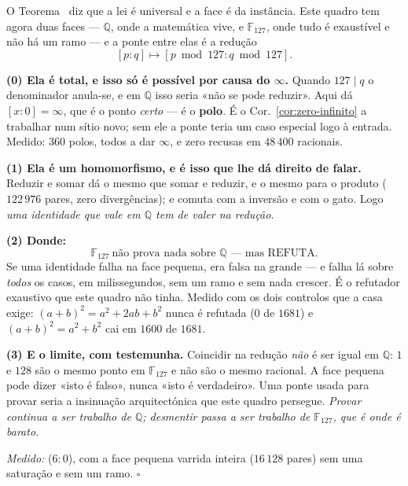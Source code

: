 \documentclass[livro.tex]{subfiles}
\begin{document}
\begin{teorema}\label{thm:reducao}
O Teorema~ diz que a lei é universal e a face é da
instância. Este quadro tem agora duas faces --- $\mathbb{Q}$, onde a
matemática vive, e $\mathbb{F}_{127}$, onde tudo é exaustível e não há um
ramo --- e a ponte entre elas é a redução
\[
[p:q]\longmapsto[p\bmod 127:q\bmod 127].
\]

\textbf{(0) Ela é total, e isso só é possível por causa do $\infty$.}
Quando $127\mid q$ o denominador anula-se, e em $\mathbb{Q}$ isso seria
«não se pode reduzir». Aqui dá $[x:0]=\infty$, que é o ponto \emph{certo}
--- é o \textbf{polo}. É o Cor.~\ref{cor:zero-infinito} a trabalhar num
sítio novo; sem ele a ponte teria um caso especial logo à entrada.
Medido: $360$ polos, todos a dar $\infty$, e zero recusas em $48\,400$
racionais.

\textbf{(1) Ela é um homomorfismo, e é isso que lhe dá direito de falar.}
Reduzir e somar dá o mesmo que somar e reduzir, e o mesmo para o produto
($122\,976$ pares, zero divergências); e comuta com a inversão e com o
gato. Logo \emph{uma identidade que vale em $\mathbb{Q}$ tem de valer na
redução}.

\textbf{(2) Donde:}
\[
\boxed{\;\mathbb{F}_{127}\ \text{não prova nada sobre }\mathbb{Q}
\text{ --- mas REFUTA.}\;}
\]
Se uma identidade falha na face pequena, era falsa na grande --- e falha
lá sobre \emph{todos} os casos, em milissegundos, sem um ramo e sem nada
crescer. É o refutador exaustivo que este quadro não tinha. Medido com os
dois controlos que a casa exige: $(a+b)^2=a^2+2ab+b^2$ nunca é refutada
($0$ de $1681$) e $(a+b)^2=a^2+b^2$ cai em $1600$ de $1681$.

\textbf{(3) E o limite, com testemunha.} Coincidir na redução \emph{não}
é ser igual em $\mathbb{Q}$: $1$ e $128$ são o mesmo ponto em
$\mathbb{F}_{127}$ e não são o mesmo racional. A face pequena pode dizer
«isto é falso», nunca «isto é verdadeiro». Uma ponte usada para provar
seria a insinuação arquitectónica que este quadro persegue.
\emph{Provar continua a ser trabalho de $\mathbb{Q}$; desmentir passa a
ser trabalho de $\mathbb{F}_{127}$, que é onde é barato.}

\emph{Medido:}  ($6{:}0$), com a face pequena
varrida inteira ($16\,128$ pares) sem uma saturação e sem um ramo.
$\square$
\end{teorema}
\end{document}
